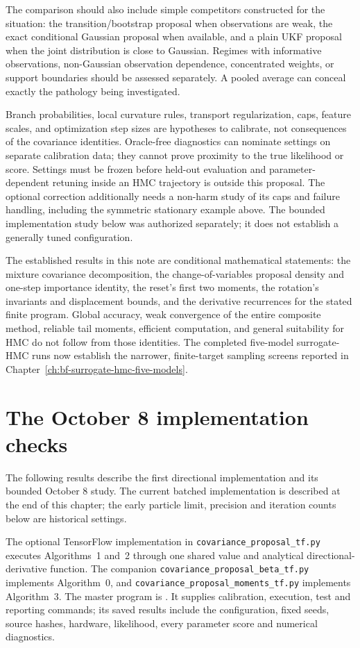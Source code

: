The comparison should also include simple competitors constructed for
the situation: the transition/bootstrap proposal when observations are
weak, the exact conditional Gaussian proposal when available, and a plain
UKF proposal when the joint distribution is close to Gaussian.
Regimes with informative observations, non-Gaussian observation dependence,
concentrated weights, or support boundaries should be assessed separately.
A pooled average can conceal exactly the pathology being investigated.

Branch probabilities, local curvature rules, transport regularization,
caps, feature scales, and optimization step sizes are hypotheses to
calibrate, not consequences of the covariance identities.
Oracle-free diagnostics can nominate settings on separate calibration data;
they cannot prove proximity to the true likelihood or score.
Settings must be frozen before held-out evaluation and parameter-dependent
retuning inside an HMC trajectory is outside this proposal.
The optional correction additionally needs a non-harm study of its caps
and failure handling, including the symmetric stationary example above.
The bounded implementation study below was authorized separately; it does
not establish a generally tuned configuration.

The established results in this note are conditional mathematical statements:
the mixture covariance decomposition, the change-of-variables proposal
density and one-step importance identity, the reset's first two moments,
the rotation's invariants and displacement bounds, and the derivative
recurrences for the stated finite program. Global accuracy, weak convergence
of the entire composite method, reliable tail moments, efficient computation,
and general suitability for HMC do not follow from those identities.
The completed five-model surrogate-HMC runs now establish the narrower,
finite-target sampling screens reported in
Chapter~\ref{ch:bf-surrogate-hmc-five-models}.


\section{The October 8 implementation checks}

The following results describe the first directional implementation and its
bounded October 8 study. The current batched implementation is described at
the end of this chapter; the early particle limit, precision and iteration
counts below are historical settings.

The optional TensorFlow implementation in
\texttt{covariance\_proposal\_tf.py} executes Algorithms~1 and~2 through one
shared value and analytical directional-derivative function. The companion
\texttt{covariance\_proposal\_beta\_tf.py} implements Algorithm~0, and
\texttt{covariance\_proposal\_moments\_tf.py} implements Algorithm~3.
The master program is
.
It supplies calibration, execution, test and reporting commands; its saved
results include the configuration, fixed seeds, source hashes, hardware,
likelihood, every parameter score and numerical diagnostics.

